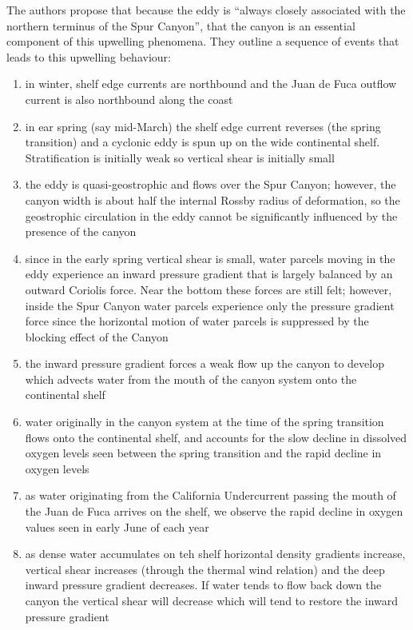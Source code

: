 \documentclass[12pt]{extreport}
\begin{document}
The authors propose that because the eddy is ``always closely associated with the northern terminus of the Spur Canyon'', that the canyon is an essential component of this upwelling phenomena. They outline a sequence of events that leads to this upwelling behaviour:
\begin{enumerate}
\item in winter, shelf edge currents are northbound and the Juan de Fuca outflow current is also northbound along the coast
\item in ear spring (say mid-March) the shelf edge current reverses (the spring transition) and a cyclonic eddy is spun up on the wide continental shelf. Stratification is initially weak so vertical shear is initially small
\item the eddy is quasi-geostrophic and flows over the Spur Canyon; however, the canyon width is about half the internal Rossby radius of deformation, so the geostrophic circulation in the eddy cannot be significantly influenced by the presence of the canyon\item since in the early spring vertical shear is small, water parcels moving in the eddy experience an inward pressure gradient that is largely balanced by an outward Coriolis force. Near the bottom these forces are still felt; however, inside the Spur Canyon water parcels experience only the pressure gradient force since the horizontal motion of water parcels is suppressed by the blocking effect of the Canyon
\item the inward pressure gradient forces a weak flow up the canyon to develop which advects water from the mouth of the canyon system onto the continental shelf
\item water originally in the canyon system at the time of the spring transition flows onto the continental shelf, and accounts for the slow decline in dissolved oxygen levels seen between the spring transition and the rapid decline in oxygen levels
\item as water originating from the California Undercurrent passing the mouth of the Juan de Fuca arrives on the shelf, we observe the rapid decline in oxygen values seen in early June of each year
\item as dense water accumulates on teh shelf horizontal density gradients increase, vertical shear increases (through the thermal wind relation) and the deep inward pressure gradient decreases. If water tends to flow back down the canyon the vertical shear will decrease which will tend to restore the inward pressure gradient
\end{enumerate}
\end{document}
